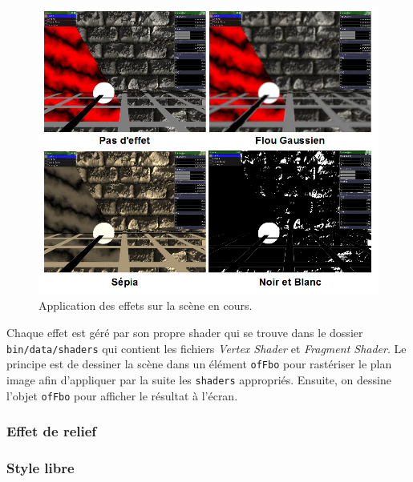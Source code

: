 \begin{figure}[H]
    \centering
	\includegraphics[scale=0.8]{img/infog-image-effet-plein-ecran.png}
	\caption{Application des effets sur la scène en cours.}
	\label{fig:effects}
\end{figure}

Chaque effet est géré par son propre shader qui se trouve dans le dossier \texttt{bin/data/shaders} qui contient les fichiers \textit{Vertex Shader} et \textit{Fragment Shader}. Le principe est de dessiner la scène dans un élément \texttt{ofFbo} pour rastériser le plan image afin d'appliquer par la suite les \texttt{shaders} appropriés. Ensuite, on dessine l'objet \texttt{ofFbo} pour afficher le résultat à l'écran.


\subsubsection{Effet de relief}

\subsubsection{Style libre}